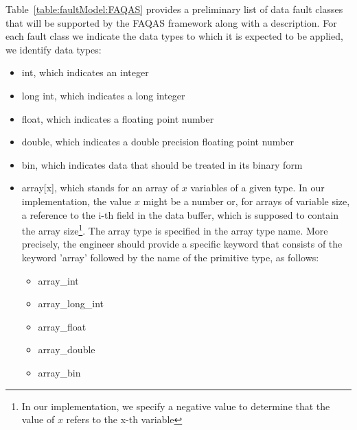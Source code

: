 Table~\ref{table:faultModel:FAQAS} provides a preliminary list of data fault classes that will be supported by the FAQAS framework along with a description. For each fault class we indicate the data types to which it is expected to be applied, we identify  data types: 
\begin{itemize}
\item int, which indicates an integer 
\item long int, which indicates a long integer 
\item float, which indicates a floating point number
\item double, which indicates a double precision floating point number
\item bin, which indicates data that should be treated in its binary form
\item array[x], which stands for an array of $x$ variables of a given type. In our implementation, the value $x$ might be a number or, for arrays of variable size, a reference to the i-th field in the data buffer, which is supposed to contain the array size\footnote{In our implementation, we specify a negative value to determine that the value of $x$ refers to the x-th variable}.  The array type is specified in the array type name. More precisely, the engineer should provide a specific keyword that consists of the keyword 'array' followed by the name of the primitive type, as follows:
\begin{itemize}
\item array\_int
\item array\_long\_int
\item array\_float
\item array\_double
\item array\_bin
\end{itemize}
\end{itemize}

